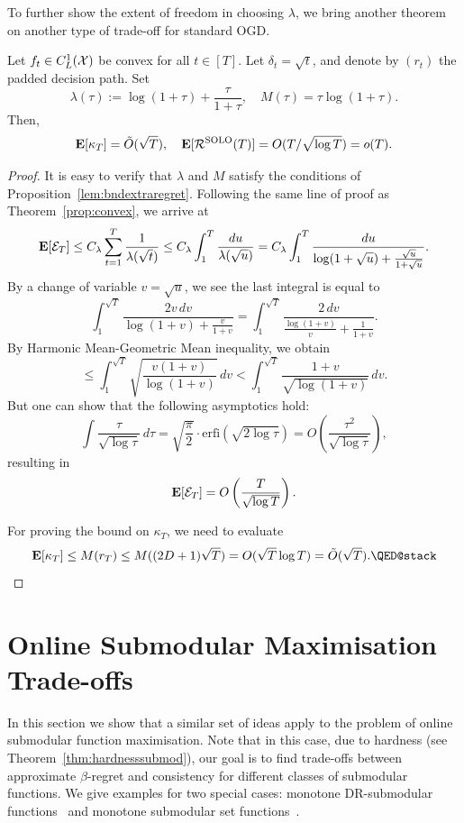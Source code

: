 To further show the extent of freedom in choosing $\lambda$, we bring another theorem on another type of trade-off for standard OGD.
\begin{theorem}
   Let $f_t\in C^1_L(\mathcal{X})$ be convex for all $t\in[T]$. Let $\delta_t = \sqrt{t}$, and denote by $(r_t)$ the padded decision path. Set
  \[
      \lambda(\tau) := \log(1+\tau) + \frac{\tau}{1+\tau}, \quad M(\tau) = \tau\log(1 + \tau).
  \]
  Then,
  \[
      \mathbf{E}[\kappa_T] = \tilde{O}(\sqrt{T}),\quad \mathbf{E}[\mathcal{R}^{\mathrm{SOLO}}(T)] = O(T/\sqrt{\log T}) = o(T).
  \]
\end{theorem}
\begin{proof}
    It is easy to verify that $\lambda$ and $M$ satisfy the conditions of Proposition~\ref{lem:bndextraregret}.  Following the same line of proof as Theorem~\ref{prop:convex}, we arrive at 
    \[
        \mathbf{E}[\mathcal{E}_T] \leq C_\lambda\sum_{t=1}^T \frac{1}{\lambda(\sqrt{t})} \leq C_\lambda\int_1^T \frac{du}{\lambda(\sqrt{u})} = C_\lambda \int_1^T \frac{du}{\log(1+ \sqrt{u}) + \frac{\sqrt{u}}{1+\sqrt{u}}}.
    \]
    By a change of variable $v = \sqrt{u}$, we see the last integral is equal to
    \[
        \int_1^{\sqrt{T}} \frac{2v\,dv}{\log(1+v) + \frac{v}{1+v}} = 
        \int_1^{\sqrt{T}} \frac{2\,dv}{\frac{\log(1+v)}{v} + \frac{1}{1+v}}.
    \]
    By Harmonic Mean-Geometric Mean inequality, we obtain
    \[
        \leq  \int_1^{\sqrt{T}} \sqrt{\frac{v(1+v)}{\log(1+v)}}\,dv < \int_1^{\sqrt{T}} \frac{1+v}{\sqrt{\log(1+v)}}\,dv.
    \]
    But one can show that the following asymptotics hold:
    \[
        \int \frac{\tau}{\sqrt{\log \tau}}\,d\tau = \sqrt{\frac{\pi}{2}}\cdot\mathrm{erfi}(\sqrt{2\log \tau}) = O\left(\frac{\tau^2}{\sqrt{\log \tau}}\right),
    \]
    resulting in
    \[
        \mathbf{E}[\mathcal{E}_T] = O\left(\frac{T}{\sqrt{\log T}}\right).
    \]

    For proving the bound on $\kappa_T$, we need to evaluate 
    \[
        \ev[\kappa_T] \leq M(r_T) \leq M((2D + 1)\sqrt{T}) = O(\sqrt{T}\log T) = \tilde{O}(\sqrt{T}). \qedhere
    \]
\end{proof}
\section{Online Submodular Maximisation Trade-offs}\label{sec:submodapplication}
In this section we show that a similar set of ideas apply to the problem of online submodular function maximisation. Note that in this case, due to hardness (see Theorem~\ref{thm:hardnesssubmod}), our goal is to find trade-offs between approximate $\beta$-regret and consistency for different classes of submodular functions. We give examples for two special cases: monotone DR-submodular functions~\cite{bian2016guaranteed} and monotone submodular set functions~\cite{nemhauser1978analysis}. 

